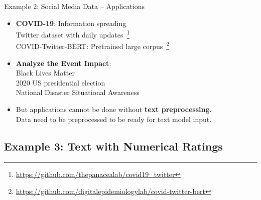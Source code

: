 \documentclass{beamer}
\renewcommand{\cite}{\citep}
\begin{document}

\begin{frame}{Example 2: Social Media Data -- Applications}
\begin{itemize}
\item \textbf{COVID-19}: Information spreading~\cite{cinelli2020covid}\\
Twitter dataset with daily updates~\cite{banda2020large}\footnote{\url{https://github.com/thepanacealab/covid19_twitter}}\\
COVID-Twitter-BERT: Pretrained large corpus{\small~\cite{muller2020covid}\footnote{\url{https://github.com/digitalepidemiologylab/covid-twitter-bert}}}
	\bigskip
\item \textbf{Analyze the Event Impact}:\\
	Black Lives Matter~\cite{giorgi2020twitter}\\
	2020 US presidential election~\cite{chen2020election2020}\\
	National Disaster Situational Awareness~\cite{karami2020twitter}
	\bigskip
\item But applications cannot be done without \textbf{text preprocessing}.\\
	Data need to be preprocessed to be ready for text model input.
\end{itemize}
\end{frame}

\subsection{Example 3: Text with Numerical Ratings}
\end{document}
